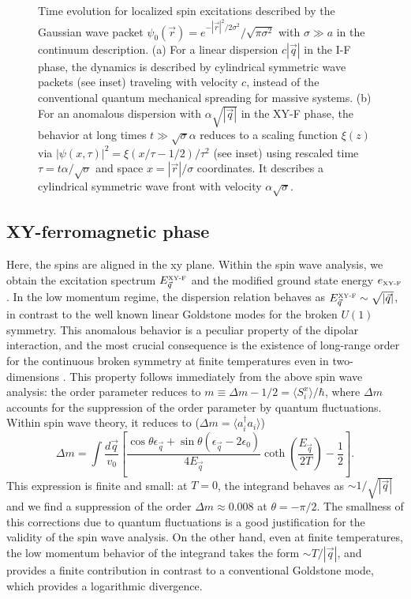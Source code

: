 \begin{figure}[ht]
    \centering
    \caption{ Time evolution for localized spin excitations described by the Gaussian wave packet $\psi_{0}({\vec r}) = e^{- |{\vec r}|^2/2\sigma^2}/\sqrt{\pi \sigma^2}$
  with $\sigma \gg a$ in the continuum description. (a) For a linear dispersion $c|{\vec q}|$ in the I-F phase, the dynamics is described by cylindrical symmetric wave packets (see inset) traveling
  with velocity $c$, instead of the conventional quantum mechanical spreading for massive systems.
  (b) For an anomalous dispersion with $\alpha \sqrt{|{\vec q}|}$ in the XY-F phase, the behavior at long times $t\gg\sqrt{\sigma} \alpha$ reduces to a
  scaling function $\xi(z)$ via $|\psi(x,\tau)|^2 = \xi(x/\tau -1/2)/\tau^2$ (see inset) using rescaled
  time $\tau = t \alpha /\sqrt{\sigma}$ and space $x = |{\vec r}|/\sigma$ coordinates. It describes a cylindrical symmetric wave front with velocity
  $\alpha \sqrt{\sigma}$.}
\end{figure}




\subsection{XY-ferromagnetic phase}
Here, the spins are aligned in the xy plane.
 Within the spin wave analysis, we obtain the excitation spectrum
 $ E^{\mbox{\tiny{XY-F}}}_{\vec q}$ and the modified ground state energy
 $e_{\mbox{\tiny{XY-F}}}$.
In the low momentum regime, the dispersion relation behaves as $ E^{\mbox{\tiny XY-F}}_{\vec q} \sim \sqrt{|{\vec q}|}$, in contrast to the well
known linear Goldstone modes for the broken $U(1)$ symmetry.
This anomalous behavior is a peculiar property of the dipolar interaction, and the most crucial consequence
is the existence of long-range order for the continuous broken symmetry at finite temperatures
even in two-dimensions \cite{Bruno2001}.
This property follows immediately from the above spin wave analysis:
the order parameter reduces to $m \equiv \Delta m - 1/2=\langle S_{i}^{x}\rangle/\hbar $, where $\Delta m$ accounts for
the suppression of the order parameter by quantum fluctuations. Within spin wave theory, it reduces to ($\Delta m = \langle a^{\dag}_{i} a_{i }\rangle$)
%
\begin{displaymath}
\Delta m\! = \!\!  \int \frac{d{\vec q}}{v_{0}}\left[\frac{\cos \theta \epsilon_{\vec q} +\sin \theta ( \epsilon_{\vec q}-2 \epsilon_{0})}{4 E_{\vec q} } \coth \left(\frac{E_{\vec q}}{2T}\right) - \frac{1}{2}\right] .
\end{displaymath}
%
This expression is finite and small: at $T=0$, the integrand behaves as $\sim 1/\sqrt{|{\vec q}|}$ and we find a
suppression of the order $\Delta m \approx 0.008$ at $\theta= - \pi/2 $. The smallness of this corrections due to
quantum fluctuations is a good justification for the validity of the spin wave analysis. On the other hand,
even at finite temperatures, the low momentum behavior of the integrand takes the form $\sim T/|{\vec q}|$,
and provides a finite contribution in contrast to a conventional Goldstone mode, which provides a logarithmic divergence.


